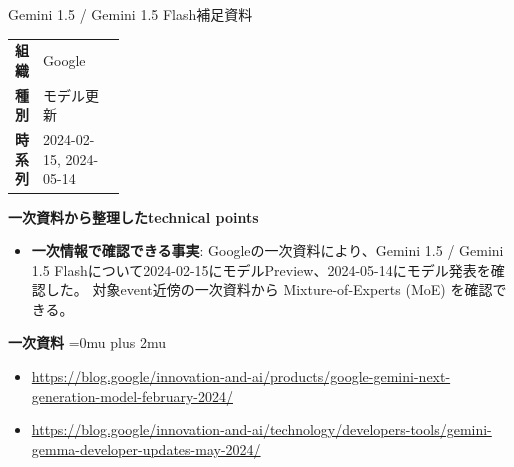 \Needspace{0.38\textheight}
\begin{technicalnote}{Gemini 1.5 / Gemini 1.5 Flash}{補足資料}
\begingroup
\begin{tabularx}{\linewidth}{@{}>{\bfseries}p{0.22\linewidth}X@{}}
組織 & Google \\
種別 & モデル更新 \\
時系列 & 2024-02-15, 2024-05-14 \\
\end{tabularx}
\smallskip
\begin{minipage}{\linewidth}
{\bfseries 一次資料から整理したtechnical points}
\begin{itemize}[leftmargin=1.5em,itemsep=0.35em]
\item \textbf{一次情報で確認できる事実}: Googleの一次資料により、Gemini 1.5 / Gemini 1.5 Flashについて2024-02-15にモデルPreview、2024-05-14にモデル発表を確認した。 対象event近傍の一次資料から Mixture-of-Experts (MoE) を確認できる。
\end{itemize}
\begin{minipage}{\linewidth}
\begin{samepage}
{\bfseries 一次資料}
\begingroup\sloppy
\Urlmuskip=0mu plus 2mu\relax
\begin{itemize}[leftmargin=1.5em,itemsep=0.25em]
\item {\scriptsize\url{https://blog.google/innovation-and-ai/products/google-gemini-next-generation-model-february-2024/}}
\item {\scriptsize\url{https://blog.google/innovation-and-ai/technology/developers-tools/gemini-gemma-developer-updates-may-2024/}}
\end{itemize}
\endgroup
\end{samepage}
\end{minipage}
\end{minipage}
\endgroup
\end{technicalnote}
\medskip
